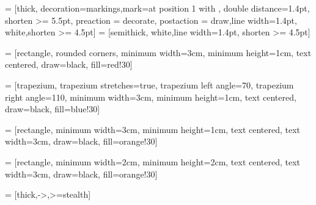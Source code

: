  = [thick, decoration={markings,mark=at position
	1 with {}},
double distance=1.4pt, shorten >= 5.5pt,
preaction = {decorate},
postaction = {draw,line width=1.4pt, white,shorten >= 4.5pt}]
 = [semithick, white,line width=1.4pt, shorten >= 4.5pt]

\usepackage{amssymb}
\usepackage{url}

 = [rectangle, rounded corners, 
minimum width=3cm, 
minimum height=1cm,
text centered, 
draw=black, 
fill=red!30]

 = [trapezium, 
trapezium stretches=true, %
trapezium left angle=70, 
trapezium right angle=110, 
minimum width=3cm, 
minimum height=1cm, text centered, 
draw=black, fill=blue!30]

 = [rectangle, 
minimum width=3cm, 
minimum height=1cm, 
text centered, 
text width=3cm, 
draw=black, 
fill=orange!30]

 = [rectangle, 
minimum width=2cm, 
minimum height=2cm, 
text centered, 
text width=3cm, 
draw=black, 
fill=orange!30]

 = [thick,->,>=stealth]

\newcommand{\Hrule}[3][.]{%
	\par\addvspace{#2}%
	\begingroup\color{#1}%
	\hrule
	\endgroup
	\addvspace{#3}%
}


